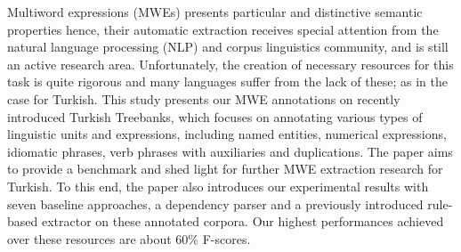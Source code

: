 Multiword expressions (MWEs) presents particular and distinctive semantic properties hence, their automatic extraction receives special attention from the natural language processing (NLP) and corpus linguistics community, and is still an active research area. Unfortunately, the creation of necessary resources for this task is quite rigorous and many languages suffer from the lack of these; as in the case for Turkish. This study presents our MWE annotations on recently introduced Turkish Treebanks, which focuses on annotating various types of linguistic units and expressions, including named entities, numerical expressions, idiomatic phrases, verb phrases with auxiliaries and duplications. The paper aims to provide a benchmark and shed light for further MWE extraction research for Turkish. To this end, the paper also introduces our experimental results with seven baseline approaches, a dependency parser and a previously introduced rule-based extractor on these annotated corpora. Our highest performances achieved over these resources are about 60\% F-scores.
